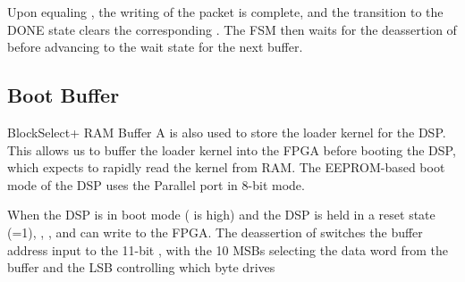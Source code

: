 Upon  equaling , the writing
of the packet is complete, and the transition to the DONE state clears
the corresponding . The FSM then waits for the
deassertion of  before advancing to the wait state for
the next buffer.
   
\subsection{Boot Buffer}

BlockSelect+ RAM Buffer A is also used to store the loader kernel for
the DSP. This allows us to buffer the loader kernel into the FPGA
before booting the DSP, which expects to rapidly read the kernel from
RAM. The EEPROM-based boot mode of the DSP uses the Parallel port in
8-bit mode.

When the DSP is in boot mode ( is high) and the DSP is
held in a reset state (=1), ,
, and  can write to the FPGA. The
deassertion of  switches the buffer address input to
the 11-bit , with the 10 MSBs selecting the data word
from the buffer and the LSB controlling which byte drives

